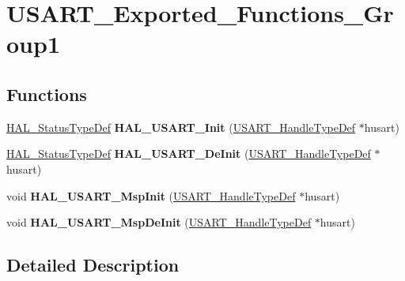 \hypertarget{group___u_s_a_r_t___exported___functions___group1}{}\section{U\+S\+A\+R\+T\+\_\+\+Exported\+\_\+\+Functions\+\_\+\+Group1}
\label{group___u_s_a_r_t___exported___functions___group1}
\subsection*{Functions}
\begin{DoxyCompactItemize}
\item 
\hyperlink{stm32f4xx__hal__def_8h_a63c0679d1cb8b8c684fbb0632743478f}{H\+A\+L\+\_\+\+Status\+Type\+Def} {\bfseries H\+A\+L\+\_\+\+U\+S\+A\+R\+T\+\_\+\+Init} (\hyperlink{struct_u_s_a_r_t___handle_type_def}{U\+S\+A\+R\+T\+\_\+\+Handle\+Type\+Def} $\ast$husart)\hypertarget{group___u_s_a_r_t___exported___functions___group1_ga388056e8e46439e4ff8f6327c1c7b955}{}\label{group___u_s_a_r_t___exported___functions___group1_ga388056e8e46439e4ff8f6327c1c7b955}

\item 
\hyperlink{stm32f4xx__hal__def_8h_a63c0679d1cb8b8c684fbb0632743478f}{H\+A\+L\+\_\+\+Status\+Type\+Def} {\bfseries H\+A\+L\+\_\+\+U\+S\+A\+R\+T\+\_\+\+De\+Init} (\hyperlink{struct_u_s_a_r_t___handle_type_def}{U\+S\+A\+R\+T\+\_\+\+Handle\+Type\+Def} $\ast$husart)\hypertarget{group___u_s_a_r_t___exported___functions___group1_gab8ba342814b8325670b01c4091047efc}{}\label{group___u_s_a_r_t___exported___functions___group1_gab8ba342814b8325670b01c4091047efc}

\item 
void {\bfseries H\+A\+L\+\_\+\+U\+S\+A\+R\+T\+\_\+\+Msp\+Init} (\hyperlink{struct_u_s_a_r_t___handle_type_def}{U\+S\+A\+R\+T\+\_\+\+Handle\+Type\+Def} $\ast$husart)\hypertarget{group___u_s_a_r_t___exported___functions___group1_gac9c43cec371f5c2da4ba18aacd4c7694}{}\label{group___u_s_a_r_t___exported___functions___group1_gac9c43cec371f5c2da4ba18aacd4c7694}

\item 
void {\bfseries H\+A\+L\+\_\+\+U\+S\+A\+R\+T\+\_\+\+Msp\+De\+Init} (\hyperlink{struct_u_s_a_r_t___handle_type_def}{U\+S\+A\+R\+T\+\_\+\+Handle\+Type\+Def} $\ast$husart)\hypertarget{group___u_s_a_r_t___exported___functions___group1_ga6d212f24838f3f4923cae63bb2e3f6b3}{}\label{group___u_s_a_r_t___exported___functions___group1_ga6d212f24838f3f4923cae63bb2e3f6b3}

\end{DoxyCompactItemize}


\subsection{Detailed Description}
